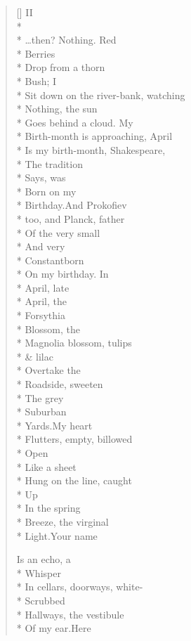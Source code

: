 \begin{verse}[\versewidth]
\hspace{0.45\versewidth} II\\*
~\\*
\ldots then? Nothing.     Red\\*
Berries\\*
Drop from a thorn\\*
Bush; I\\*
Sit down on the river-bank, watching\\*
Nothing, the sun\\*
Goes behind a cloud.  My\\*
Birth-month is approaching, April\\*
Is my birth-month, Shakespeare,\\*
The tradition\\*
Says, was\\*
Born on my\\*
Birthday.\qquad And Prokofiev\\*
too, and Planck, father\\*
Of the very small\\*
And very\\*
Constant\qquad born\\*
On my birthday. \qquad In\\*
April, late\\*
April, the\\*
Forsythia\\*
Blossom, the\\*
Magnolia blossom, tulips\\*
\& lilac \\*
Overtake the \\*
Roadside, sweeten\\*
The grey\\*
Suburban\\*
Yards.\qquad My heart\\*
Flutters, empty, billowed\\*
Open\\*
Like a sheet\\*
Hung on the line, caught\\*
Up\\*
In the spring\\*
Breeze, the virginal\\*
Light.\qquad \qquad Your name

Is an echo, a\\*
Whisper\\*
In cellars, doorways, white-\\*
Scrubbed\\*
Hallways, the vestibule\\*
Of my ear.\quad Here


\end{verse}
